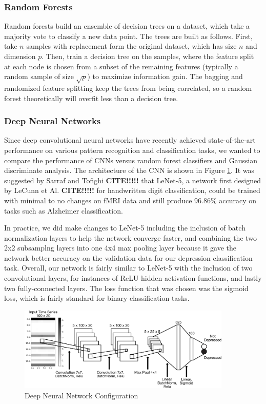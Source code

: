 \documentclass{article}[12pt]
\begin{document}
   
   \subsubsection{Random Forests}
   Random forests build an ensemble of decision trees on a dataset, which take a majority vote to classify a new data point. The trees are built as follows.  First, take $n$ samples with replacement form the original dataset, which has size $n$ and dimension $p$.  Then, train a decision tree on the samples, where the feature split at each node is chosen from a subset of the remaining features (typically a random sample of size $\sqrt{p}$) to maximize information gain.  The bagging and randomized feature splitting keep the trees from being correlated, so a random forest theoretically will overfit less than a decision tree.
   
   \subsubsection{Deep Neural Networks}
   Since deep convolutional neural networks have recently achieved state-of-the-art performance on various pattern recognition and classification tasks, we wanted to compare the performance of CNNs versus random forest classifiers and Gaussian discriminate analysis. The architecture of the CNN is shown in Figure \ref{fig:dnnConfig}.  It was suggested by Sarraf and Tofighi \textbf{CITE!!!!!} that LeNet-5, a network first designed by LeCunn et Al. \textbf{CITE!!!!!} for handwritten digit classification, could be trained with minimal to no changes on fMRI data and still produce 96.86\% accuracy on tasks such as Alzheimer classification. 
   
   In practice, we did make changes to LeNet-5 including the inclusion of batch normalization layers to help the network converge faster, and combining the two 2x2 subsamplng layers into one 4x4 max pooling layer because it gave the network better accuracy on the validation data for our depression classification task. Overall, our network is fairly similar to LeNet-5 with the inclusion of two convolutional layers, for instances of ReLU hidden activation functions, and lastly two fully-connected layers. The loss function that was chosen was the sigmoid loss, which is fairly standard for binary classification tasks.  
   
   \begin{figure}[!htb]
   	\centering
   	\includegraphics[width=4in]{DNN_diagram_annotated.pdf}
   	\caption{Deep Neural Network Configuration}
   	\label{fig:dnnConfig}
   \end{figure}
   
\end{document}
